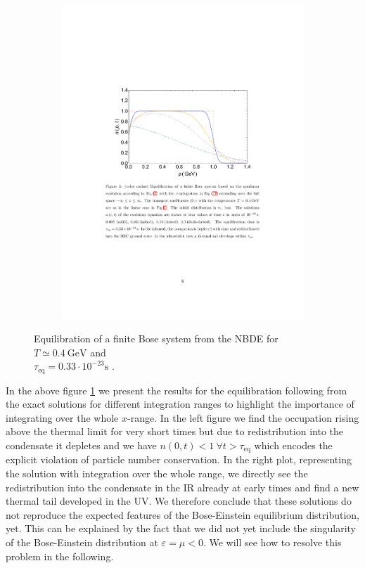 \begin{figure}[H]
\begin{subfigure}[c]{0.49\textwidth}
\includegraphics[width=\textwidth]{figures/nbde_full_range}
\end{subfigure}
\caption{Equilibration of a finite Bose system from the NBDE for $T\simeq 0.4\ \mathrm{GeV}$ and \\ $\tau_{\mathrm{eq}} =  0.33\cdot 10^{-23} \mathrm{s}$ \cite{Wolschin2018}.}
\label{fig:full_sol_ranges}
\end{figure}
\noindent
In the above figure \ref{fig:full_sol_ranges} we present the results for the equilibration following from the exact solutions for different integration ranges to highlight the importance of integrating over the whole $x$-range. In the left figure we find the occupation rising above the thermal limit for very short times but due to redistribution into the condensate it depletes and we have $n(0,t)<1 \ \forall t >\tau_{\mathrm{eq}}$ which encodes the explicit violation of particle number conservation. In the right plot, representing the solution with integration over the whole range, we directly see the redistribution into the condensate in the IR already at early times and find a new thermal tail developed in the UV. We therefore conclude that these solutions do not reproduce the expected features of the Bose-Einstein equilibrium distribution, yet. This can be explained by the fact that we did not yet include  the singularity of the Bose-Einstein distribution at $\varepsilon=\mu <0$. We will see how to resolve this problem in the following.

